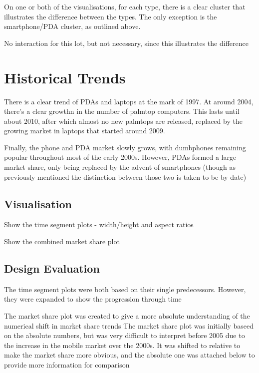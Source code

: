 \documentclass[conference]{IEEEtran}
\begin{document}
On one or both of the visualisations, for each type, there is a clear cluster that illustrates the difference between the types. The only exception is the smartphone/PDA cluster, as outlined above.

No interaction for this lot, but not necessary, since this illustrates the difference

\section{Historical Trends}

There is a clear trend of PDAs and laptops at the mark of 1997. At around 2004, there's a clear growthn in the number of palmtop computers. This lasts until about 2010, after which almost no new palmtops are released, replaced by the growing market in laptops that started around 2009.

Finally, the phone and PDA market slowly grows, with dumbphones remaining popular throughout most of the early 2000s. However, PDAs formed a large market share, only being replaced by the advent of smartphones (though as previously mentioned the distinction between those two is taken to be by date)

\subsection{Visualisation}

Show the time segment plots - width/height and aspect ratios

Show the combined market share plot

\subsection{Design Evaluation}

The time segment plots were both based on their single predecessors. However, they were expanded to show the progression through time

The market share plot was created to give a more absolute understanding of the numerical shift in market share trends
The market share plot was initially baseed on the absolute numbers, but was very difficult to interpret before 2005 due to the increase in the mobile market over the 2000s. It was shifted to relative to make the market share more obvious, and the absolute one was attached below to provide more information for comparison
\end{document}
